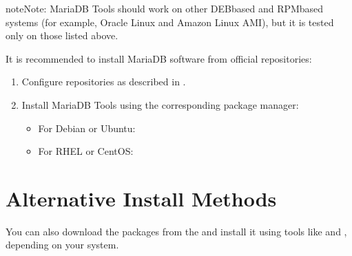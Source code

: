 \documentclass[letterpaper,10pt,english]{sphinxmanual}
\begin{document}
\begin{sphinxadmonition}{note}{Note:}
\sphinxAtStartPar
MariaDB Tools should work on other DEB\sphinxhyphen{}based and RPM\sphinxhyphen{}based systems
(for example, Oracle Linux and Amazon Linux AMI),
but it is tested only on those listed above.
\end{sphinxadmonition}

\sphinxAtStartPar
It is recommended to install MariaDB software from official repositories:
\begin{enumerate}
%
\item {} 
\sphinxAtStartPar
Configure repositories as described in
.

\item {} 
\sphinxAtStartPar
Install MariaDB Tools using the corresponding package manager:
\begin{itemize}
\item {} 
\sphinxAtStartPar
For Debian or Ubuntu:

\begin{sphinxVerbatim}[commandchars=\\\{\}]
   
\end{sphinxVerbatim}

\item {} 
\sphinxAtStartPar
For RHEL or CentOS:

\begin{sphinxVerbatim}[commandchars=\\\{\}]
   
\end{sphinxVerbatim}

\end{itemize}

\end{enumerate}


\section{Alternative Install Methods}
\label{\detokenize{installation:alternative-install-methods}}
\sphinxAtStartPar
You can also download the packages from the
and install it using tools like  and ,
depending on your system.
\end{document}
